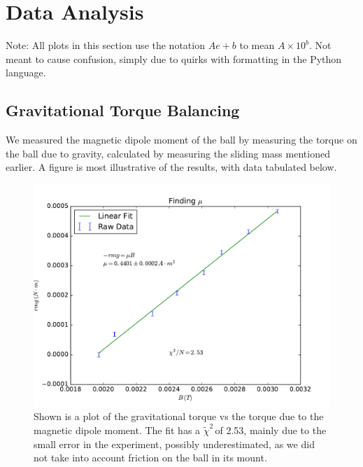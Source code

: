 \documentclass{article}
\newcommand{\redchi}{$\tilde{\chi}^2\,$}
\begin{document}
\section{Data Analysis}
	Note: All plots in this section use the notation $Ae\!+\!b$ to mean $A \times 10^{b}$.  Not meant to cause confusion, simply due to quirks with formatting in the Python language.
	\subsection{Gravitational Torque Balancing}
	We measured the magnetic dipole moment of the ball by measuring the torque on the ball due to gravity, calculated by measuring the sliding mass mentioned earlier.  A figure is most illustrative of the results, with data tabulated below.

	\begin{figure}[!htb]
		\centering
		\includegraphics[scale=.5]{../plots/rmgvsmub.pdf}
		\caption{Shown is a plot of the gravitational torque vs the torque due to the magnetic dipole moment.  The fit has a \redchi of 2.53, mainly due to the small error in the experiment, possibly underestimated, as we did not take into account friction on the ball in its mount.}
	\end{figure}
\end{document}
